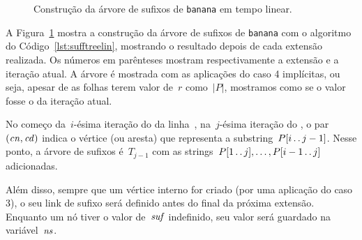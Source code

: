 \begin{figure}
{\begin{minipage}{0.45\textwidth}
\end{minipage}
}
\hfill
{}
\hfill
{}


\caption{Construção da árvore de sufixos de \texttt{banana} em tempo linear.}
\label{fig:bananalin}
\end{figure}


A Figura~\ref{fig:bananalin} mostra a construção da árvore de sufixos de \texttt{banana} com o algoritmo do Código~\ref{lst:sufftreelin}, mostrando o resultado depois de cada extensão realizada. Os números em parênteses mostram respectivamente a extensão e a iteração atual. A árvore é mostrada com as aplicações do caso 4 implícitas, ou seja, apesar de as folhas terem valor de~$r$ como~$|P|$, mostramos como se o valor fosse o da iteração atual.

\pagebreak
\begin{invar}
No começo da~$i$-ésima iteração do  da linha~, na~$j$-ésima iteração do , o par~$(\mathit{cn}, \mathit{cd})$ indica o vértice (ou aresta) que representa a substring~${P[i\,.\,.\, j-1]}$. Nesse ponto, a árvore de sufixos é~$T_{j-1}$ com as strings~$P[1\,.\,.\, j], \ldots, P[i-1\,.\,.\, j]$ adicionadas.

Além disso, sempre que um vértice interno for criado (por uma aplicação do caso 3), o seu link de sufixo será definido antes do final da próxima extensão. Enquanto um nó tiver o valor de~$\mathit{suf}$ indefinido, seu valor será guardado na variável~$\mathit{ns}$.
\end{invar}

